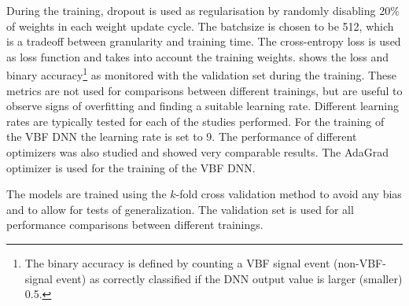 During the training, dropout is used as regularisation by randomly disabling 20\% of weights in each weight update cycle. 
The batchsize is chosen to be 512, which is a tradeoff between granularity and training time. 
The cross-entropy loss is used as loss function and takes into account the training weights. 
 shows the loss and binary accuracy\footnote{The binary accuracy is defined by counting a VBF signal event (non-VBF-signal event) as correctly classified if the DNN output value is larger (smaller) 0.5. 
} as monitored with the validation set during the training. These metrics are not used for comparisons between different trainings, but are useful to observe signs of overfitting and finding a suitable learning rate.  
Different learning rates are typically tested for each of the studies performed.
For the training of the VBF DNN the learning rate is set to 9. 
The performance of different optimizers was also studied and showed very comparable results. The AdaGrad optimizer is used for the training of the VBF DNN.

The models are trained using the $k$-fold cross validation method to avoid any bias and to allow for tests of generalization. The validation set is used for all performance comparisons between different trainings.


